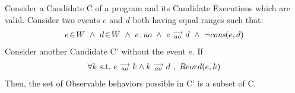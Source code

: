 \begin{corollary}
    Consider a Candidate C of a program and its Candidate Executions which are valid. Consider two events $e$ and $d$ both having equal ranges such that:
    \begin{align*}
        \event{e}{W} \ \wedge \ \event{d}{W} \ \wedge \ \et{e}{uo} \ \wedge \ \reln{e}{ao}{d} \ \wedge \ \neg\cons{e}{d}
    \end{align*} 
    Consider another Candidate C' without the event $e$. If
    \begin{align*}
        \forall k \ \text{s.t.} \ e\stackrel{\longrightarrow}{_{ao}}k \wedge k\stackrel{\longrightarrow}{_{ao}}d \ , \
        Reord(e, k)
    \end{align*}
    Then, the set of Observable behaviors possible in C' is a subset of C.
\end{corollary}

